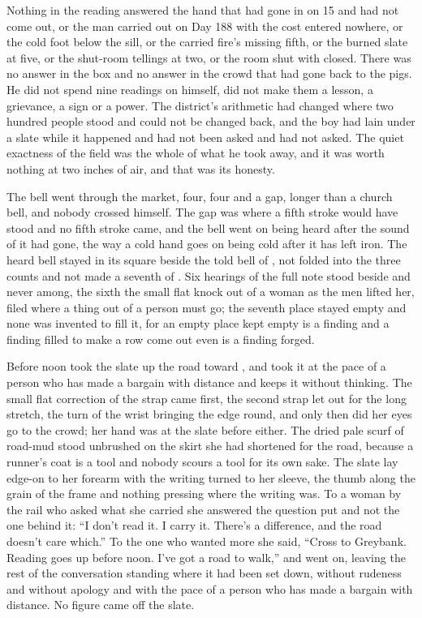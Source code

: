 Nothing in the reading answered the hand that had gone in on  15 and had not come out, or the man carried out on Day 188 with the cost entered nowhere, or the cold foot below the sill, or the carried fire's missing fifth, or the burned slate at five, or the shut-room tellings at two, or the room shut with  closed. There was no answer in the box and no answer in the crowd that had gone back to the pigs. He did not spend nine readings on himself, did not make them a lesson, a grievance, a sign or a power. The district's arithmetic had changed where two hundred people stood and could not be changed back, and the boy had lain under a slate while it happened and had not been asked and had not asked. The quiet exactness of the field was the whole of what he took away, and it was worth nothing at two inches of air, and that was its honesty.

The bell went through the market, four, four and a gap, longer than a church bell, and nobody crossed himself. The gap was where a fifth stroke would have stood and no fifth stroke came, and the bell went on being heard after the sound of it had gone, the way a cold hand goes on being cold after it has left iron. The heard bell stayed in its square beside the told bell of , not folded into the three counts and not made a seventh of . Six hearings of the full note stood beside and never among, the sixth the small flat knock out of a woman as the men lifted her, filed where a thing out of a person must go; the seventh place stayed empty and none was invented to fill it, for an empty place kept empty is a finding and a finding filled to make a row come out even is a finding forged.

\scenebreak

Before noon  took the slate up the road toward , and took it at the pace of a person who has made a bargain with distance and keeps it without thinking. The small flat correction of the strap came first, the second strap let out for the long stretch, the turn of the wrist bringing the edge round, and only then did her eyes go to the crowd; her hand was at the slate before either. The dried pale scurf of road-mud stood unbrushed on the skirt she had shortened for the road, because a runner's coat is a tool and nobody scours a tool for its own sake. The slate lay edge-on to her forearm with the writing turned to her sleeve, the thumb along the grain of the frame and nothing pressing where the writing was. To a woman by the rail who asked what she carried she answered the question put and not the one behind it: “I don't read it. I carry it. There's a difference, and the road doesn't care which.” To the one who wanted more she said, “Cross to Greybank. Reading goes up before noon. I've got a road to walk,” and went on, leaving the rest of the conversation standing where it had been set down, without rudeness and without apology and with the pace of a person who has made a bargain with distance. No figure came off the slate.

